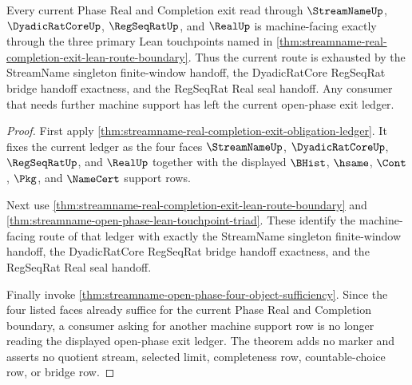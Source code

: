 \begin{theorem}
\label{thm:streamname-open-phase-lean-route-totality}
Every current Phase Real and Completion exit read through $\StreamNameUp$, $\DyadicRatCoreUp$, $\RegSeqRatUp$, and $\RealUp$ is machine-facing exactly through the three primary Lean touchpoints named in \autoref{thm:streamname-real-completion-exit-lean-route-boundary}. Thus the current route is exhausted by the StreamName singleton finite-window handoff, the DyadicRatCore RegSeqRat bridge handoff exactness, and the RegSeqRat Real seal handoff. Any consumer that needs further machine support has left the current open-phase exit ledger.
\end{theorem}
\begin{proof}
First apply \autoref{thm:streamname-real-completion-exit-obligation-ledger}. It fixes the current ledger as the four faces $\StreamNameUp$, $\DyadicRatCoreUp$, $\RegSeqRatUp$, and $\RealUp$ together with the displayed $\BHist$, $\hsame$, $\Cont$, $\Pkg$, and $\NameCert$ support rows.

Next use \autoref{thm:streamname-real-completion-exit-lean-route-boundary} and \autoref{thm:streamname-open-phase-lean-touchpoint-triad}. These identify the machine-facing route of that ledger with exactly the StreamName singleton finite-window handoff, the DyadicRatCore RegSeqRat bridge handoff exactness, and the RegSeqRat Real seal handoff.

Finally invoke \autoref{thm:streamname-open-phase-four-object-sufficiency}. Since the four listed faces already suffice for the current Phase Real and Completion boundary, a consumer asking for another machine support row is no longer reading the displayed open-phase exit ledger. The theorem adds no marker and asserts no quotient stream, selected limit, completeness row, countable-choice row, or bridge row.
\end{proof}

